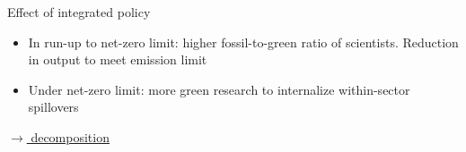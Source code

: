 \documentclass[11pt,aspectratio=169]{beamer}
\begin{document}
\begin{frame}{Effect  of integrated policy}
	\begin{block}{}
		\begin{itemize}
			\item In run-up to net-zero limit: higher fossil-to-green ratio of scientists. Reduction in output to meet emission limit
			\item Under net-zero limit: more green research to internalize within-sector spillovers %
		\end{itemize}
	\end{block}	
	
	\vspace{-5.5mm}
	\hfill
	\hyperlink{mec0}{\tiny{$\rightarrow$ decomposition}}
\end{frame}

\hypertarget{conc}{}
\end{document}
